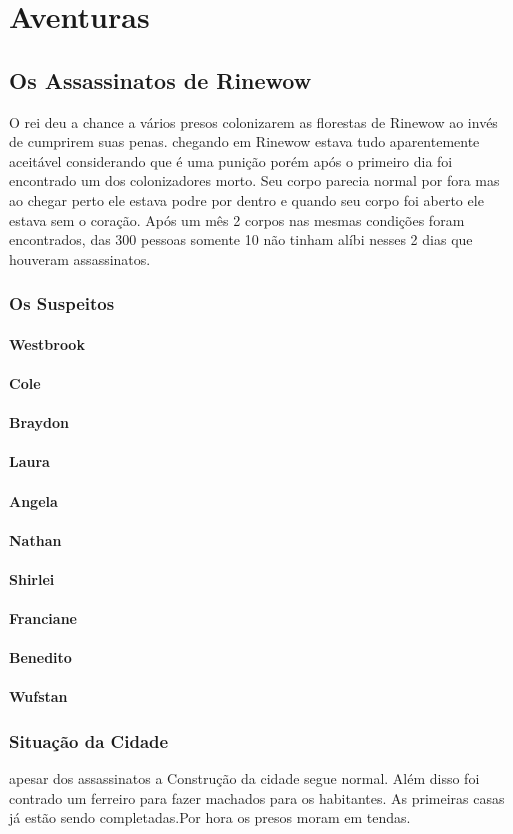 \part{Aventuras}
\chapter{Os Assassinatos de Rinewow}
O rei deu a chance a vários presos colonizarem as florestas de Rinewow
ao invés de cumprirem suas penas.
chegando em Rinewow estava tudo aparentemente aceitável considerando que é uma punição
porém após o primeiro dia foi encontrado um dos colonizadores morto.
Seu corpo parecia normal por fora mas ao chegar perto ele estava podre por dentro e quando seu corpo foi aberto ele estava sem o coração.
Após um mês 2 corpos nas mesmas condições foram encontrados,
das 300 pessoas somente 10 não tinham alíbi
nesses 2 dias que houveram assassinatos.
%
\section{Os Suspeitos}
\subsection{Westbrook}
\subsection{Cole}
\subsection{Braydon}
\subsection{Laura}
\subsection{Angela}
\subsection{Nathan}
\subsection{Shirlei}
\subsection{Franciane}
\subsection{Benedito}
\subsection{Wufstan}
\section{Situação da Cidade}
apesar dos assassinatos a Construção da cidade segue normal.
Além disso foi contrado um ferreiro para fazer machados para os habitantes.
As primeiras casas já estão sendo completadas.Por hora os presos moram em tendas.
